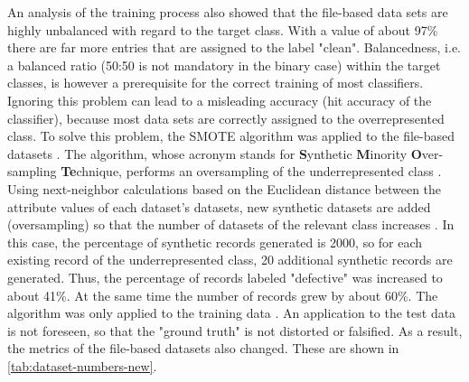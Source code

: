 An analysis of the training process also showed that the file-based data sets are highly unbalanced with regard to the target class. With a value of about 97\% there are far more entries that are assigned to the label "clean". Balancedness, i.e. a balanced ratio (50:50 is not mandatory in the binary case) within the target classes, is however a prerequisite for the correct training of most classifiers. Ignoring this problem can lead to a misleading accuracy (hit accuracy of the classifier), because most data sets are correctly assigned to the overrepresented class. To solve this problem, the SMOTE algorithm was applied to the file-based datasets \cite{Chawla2002}. The algorithm, whose acronym stands for \textbf{S}ynthetic \textbf{M}inority \textbf{O}ver-sampling \textbf{Te}chnique, performs an oversampling of the underrepresented class \cite{Chawla2002}. Using next-neighbor calculations based on the Euclidean distance between the attribute values of each dataset's datasets, new synthetic datasets are added (oversampling) so that the number of datasets of the relevant class increases \cite{Chawla2002}. In this case, the percentage of synthetic records generated is 2000, so for each existing record of the underrepresented class, 20 additional synthetic records are generated. Thus, the percentage of records labeled "defective" was increased to about 41\%. At the same time the number of records grew by about 60\%. The algorithm was only applied to the training data \cite{Chawla2002} . An application to the test data is not foreseen, so that the "ground truth" is not distorted or falsified. As a result, the metrics of the file-based datasets also changed. These are shown in \autoref{tab:dataset-numbers-new}.

